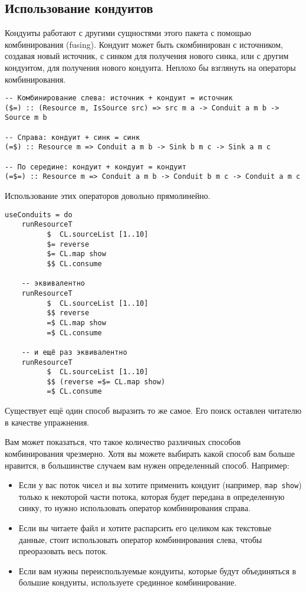\subsection{Использование кондуитов}
Кондуиты работают с другими сущностями этого пакета с помощью комбинирования (fusing).
Кондуит может быть скомбинирован с источником, создавая новый источник, 
с синком для получения нового синка, или с другим кондуитом, для получения 
нового кондуита. Неплохо бы взглянуть на операторы комбинирования. 
\begin{lstlisting}
-- Комбинирование слева: источник + кондуит = источник
($=) :: (Resource m, IsSource src) => src m a -> Conduit a m b -> Source m b

-- Справа: кондуит + синк = синк
(=$) :: Resource m => Conduit a m b -> Sink b m c -> Sink a m c

-- По середине: кондуит + кондуит = кондуит
(=$=) :: Resource m => Conduit a m b -> Conduit b m c -> Conduit a m c
\end{lstlisting}
Использование этих операторов довольно прямолинейно.
\begin{lstlisting}
useConduits = do
    runResourceT
          $  CL.sourceList [1..10]
          $= reverse
          $= CL.map show
          $$ CL.consume

    -- эквивалентно
    runResourceT
          $  CL.sourceList [1..10]
          $$ reverse
          =$ CL.map show
          =$ CL.consume

    -- и ещё раз эквивалентно
    runResourceT
          $  CL.sourceList [1..10]
          $$ (reverse =$= CL.map show)
          =$ CL.consume
\end{lstlisting}
Существует ещё один способ выразить то же самое. Его поиск оставлен читателю
 в качестве упражнения.

Вам может показаться, что такое количество различных способов комбинирования 
чрезмерно. Хотя вы можете выбирать какой способ вам больше нравится, 
в большинстве случаем вам нужен определенный способ. Например:

\begin{itemize}   
\item Если у вас поток чисел и вы хотите применить кондуит (например, 
\lstinline'map show') только к некоторой части потока, которая будет передана 
в определенную синку, то нужно использовать оператор комбинирования справа.
\item Если вы читаете файл и хотите распарсить его целиком как текстовые данные, 
стоит использовать оператор комбинирования слева, чтобы преоразовать весь поток.
\item Если вам нужны переиспользуемые кондуиты, которые будут объединяться в 
большие кондуиты, используете срединное комбинирование.
\end{itemize}

